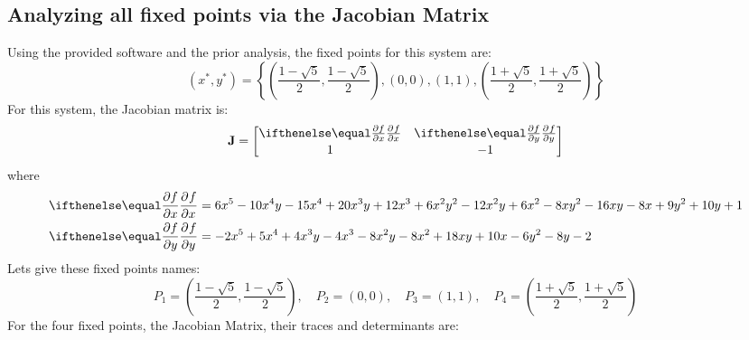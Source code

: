 \subsection{Analyzing all fixed points via the Jacobian Matrix}\label{subsec:analyzing-all-fixed-points-via-the-jacobian-matrix}
Using the provided software and the prior analysis, the fixed points for this system are:
\begin{equation*}
    \left(x^*,y^*\right) = \left\{\left(\frac{1-\sqrt{5}}{2}, \frac{1-\sqrt{5}}{2}\right), \left(0,0\right), \left(1,1\right), \left(\frac{1+\sqrt{5}}{2}, \frac{1+\sqrt{5}}{2}\right)\right\}
\end{equation*}
For this system, the Jacobian matrix is:
\begin{equation*}
    \textbf{J} = \begin{bmatrix}
        \pdiff[]{f}{x} & \pdiff[]{f}{y}\\
        1 & -1
    \end{bmatrix}
\end{equation*}
where
\begin{align*}
    \pdiff[]{f}{x} &= 6x^5-10x^4y-15x^4+20x^3y+12x^3+6x^2y^2-12x^2y+6x^2-8xy^2-16xy-8x+9y^2+10y+1\\
    \pdiff[]{f}{y} &= -2x^5+5x^4+4x^3y-4x^3-8x^2y-8x^2+18xy+10x-6y^2-8y-2
\end{align*}
Lets give these fixed points names:
\begin{equation*}
    P_1=\left(\frac{1-\sqrt{5}}{2}, \frac{1-\sqrt{5}}{2}\right),\quad P_2=\left(0,0\right),\quad P_3=\left(1,1\right),\quad P_4=\left(\frac{1+\sqrt{5}}{2}, \frac{1+\sqrt{5}}{2}\right)
\end{equation*}
For the four fixed points, the Jacobian Matrix, their traces and determinants are:
